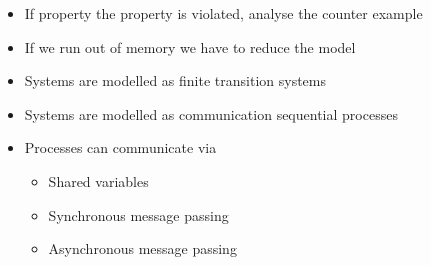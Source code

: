 \begin{itemize}
\begin{itemize}
\begin{itemize}
                \end{itemize}
                \begin{itemize}
                    \item If property the property is violated, analyse the counter example
                    \item If we run out of memory we have to reduce the model
                \end{itemize}
        \end{itemize}
        \begin{itemize}
            \item Systems are modelled as finite transition systems
            \item Systems are modelled as communication sequential processes
            \item Processes can communicate via
                \begin{itemize}
                    \item Shared variables
                    \item Synchronous message passing
                    \item Asynchronous message passing
                \end{itemize}
        \end{itemize}
\end{itemize}

